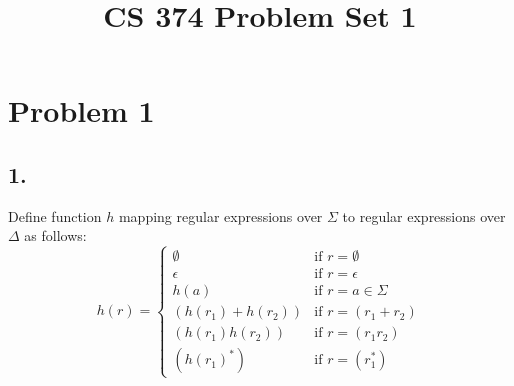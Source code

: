 \documentclass[11pt]{article}
\title{\textbf{CS 374 Problem Set 1}}
\date{}
\begin{document}
\maketitle

\section*{Problem 1}
\subsection*{1.}
Define function $h$ mapping regular expressions over $\Sigma$ to regular expressions over $\Delta$ as follows:
\[h(r)=
	\begin{cases}
	\emptyset & \text{if } r=\emptyset \\
	\epsilon & \text{if } r=\epsilon \\
	h(a) & \text{if } r=a\in\Sigma \\
	(h(r_1)+h(r_2)) & \text{if } r=(r_1+r_2) \\
	(h(r_1)h(r_2)) & \text{if } r=(r_1r_2) \\
	(h(r_1)^*) & \text{if } r=(r_1^*)
	\end{cases}
\]
\end{document}
